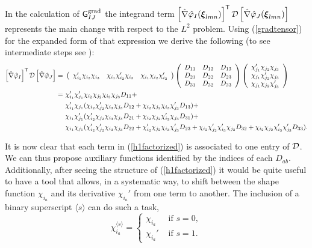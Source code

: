 In the calculation of $\mathsf{G}_{IJ}^{\operatorname{grad}}$ the integrand term $\left[\hat{\nabla}\hat{\varphi}_I(\boldsymbol{\xi}_{lmn})\right]^{\mathsf{T}}\mathcal{D}\left[\hat{\nabla}\hat{\varphi}_J(\boldsymbol{\xi}_{lmn})\right]$ represents the main change with respect to the $L^2$ problem. Using (\ref{gradtensor}) for the expanded form of that expression we derive the following (to see intermediate steps see \cite{hpbook2}):
% 
\begin{align}
        \left[\hat{\nabla}\hat{\varphi}_I\right]^{\mathsf{T}}\mathcal{D}\left[\hat{\nabla}\hat{\varphi}_J\right]
        =\ &
        \left(\begin{array}{ccc}
        \chi_{i_1}' \chi_{i_2} \chi_{i_3}  &
        \chi_{i_1} \chi_{i_2}' \chi_{i_3}  &
        \chi_{i_1} \chi_{i_2} \chi_{i_3}' 
    \end{array}\right)
    \left(\begin{array}{ccc}
         D_{11} & D_{12} & D_{13}  \\
         D_{21} & D_{22} & D_{23}  \\
         D_{31} & D_{32} & D_{33}
    \end{array}\right)
    \left(\begin{array}{c}
        \chi_{j_1}' \chi_{j_2} \chi_{j_3}  \\
        \chi_{j_1} \chi_{j_2}' \chi_{j_3}  \\
        \chi_{j_1} \chi_{j_2} \chi_{j_3}'
    \end{array}\right) \\
      \ =\ & \chi_{i_1}'\chi_{j_1}'\chi_{i_2}\chi_{j_2}\chi_{i_3}\chi_{j_3}D_{11}+\nonumber\\
      \    & \chi_{i_1}'\chi_{j_1}(\chi_{i_2}\chi_{j_2}'\chi_{i_3}\chi_{j_3}D_{12}+\chi_{i_2}\chi_{j_2}\chi_{i_3}\chi_{j_3}'D_{13})+\nonumber\\
      \    & \chi_{i_1}\chi_{j_1}'(\chi_{i_2}'\chi_{j_2}\chi_{i_3}\chi_{j_3}D_{21}+\chi_{i_2}\chi_{j_2}\chi_{i_3}'\chi_{j_3}D_{31})+\nonumber\\
      \    & \chi_{i_1}\chi_{j_1}(\chi_{i_2}'\chi_{j_2}'\chi_{i_3}\chi_{j_3}D_{22}+\chi_{i_2}'\chi_{j_2}\chi_{i_3}\chi_{j_3}'D_{23}+\chi_{i_2}\chi_{j_2}'\chi_{i_3}'\chi_{j_3}D_{32}+\chi_{i_2}\chi_{j_2}\chi_{i_3}'\chi_{j_3}'D_{33}).
      \label{h1factorized}
\end{align}

It is now clear that each term in (\ref{h1factorized}) is associated to one entry of $\mathcal{D}$. We can thus propose auxiliary functions identified by the indices of each $D_{ab}$. Additionally, after seeing the structure of (\ref{h1factorized}) it would be quite useful to have a tool that allows, in a systematic way, to shift between the shape function $\chi_{i_a}$ and its derivative $\chi_{i_a}'$ from one term to another. The inclusion of a binary superscript $\langle s\rangle$ can do such a task,
% 
\begin{equation}
    \chi^{\langle s\rangle}_{i_a}=
    \begin{cases}
        \chi_{i_a} &\text{ if } s=0,\\
        \chi_{i_a}'&\text{ if } s=1.
    \end{cases}
    \label{chisuperscript}
\end{equation}


